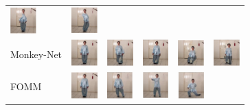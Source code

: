 \documentclass{article}
\begin{document}
\begin{table}[t]
\begin{center}
\begin{small}
\begin{sc}
\begin{tabular}{m{1.5cm}m{1.5cm}m{1.5cm}}
\includegraphics[width=1cm, height=1cm]{paper/images/1_X2Face_4.JPG}&
\includegraphics[width=1cm, height=1cm]{paper/images/1_X2Face_5.JPG}\\
Monkey-Net & \includegraphics[width=1cm, height=1cm]{paper/images/2_Monkey-Net_1.JPG} & \includegraphics[width=1cm, height=1cm]{paper/images/2_Monkey-Net_2.JPG} &
\includegraphics[width=1cm, height=1cm]{paper/images/2_Monkey-Net_3.JPG}&
\includegraphics[width=1cm, height=1cm]{paper/images/2_Monkey-Net_4.JPG}&
\includegraphics[width=1cm, height=1cm]{paper/images/2_Monkey-Net_5.JPG}\\
FOMM & \includegraphics[width=1cm, height=1cm]{paper/images/3_FOMM_1.JPG} & \includegraphics[width=1cm, height=1cm]{paper/images/3_FOMM_2.JPG} &
\includegraphics[width=1cm, height=1cm]{paper/images/3_FOMM_3.JPG}&
\includegraphics[width=1cm, height=1cm]{paper/images/3_FOMM_4.JPG}&

\end{tabular}
\end{sc}
\end{small}
\end{center}
\end{table}
\end{document}
